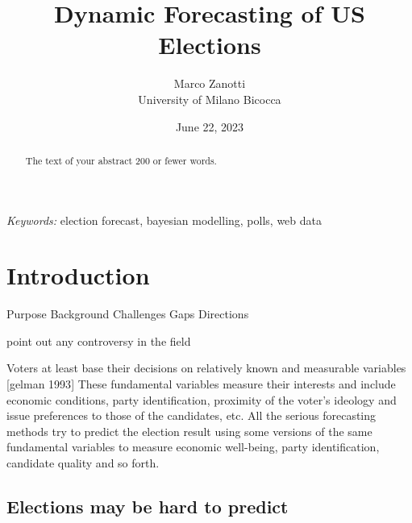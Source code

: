 \documentclass[
  12pt]{article}
\begin{document}
\def\spacingset#1{\renewcommand{\baselinestretch}%
{#1}\small\normalsize} \spacingset{1}



\date{June 22, 2023}
\title{\bf Dynamic Forecasting of US Elections}
\author{
Marco Zanotti\\
University of Milano Bicocca\\
}
\maketitle

\bigskip
\bigskip
\begin{abstract}
The text of your abstract 200 or fewer words.
\end{abstract}

\noindent%
{\it Keywords:} election forecast, bayesian modelling, polls, web data
\vfill

\newpage
\spacingset{1.9} %
\ifdefined\Shaded\renewenvironment{Shaded}{\begin{tcolorbox}[frame hidden, borderline west={3pt}{0pt}{shadecolor}, enhanced, boxrule=0pt, sharp corners, interior hidden, breakable]}{\end{tcolorbox}}\fi

\hypertarget{sec-intro}{%
\section{Introduction}\label{sec-intro}}

Purpose Background Challenges Gaps Directions

point out any controversy in the field

Voters at least base their decisions on relatively known and measurable
variables {[}gelman 1993{]} These fundamental variables measure their
interests and include economic conditions, party identification,
proximity of the voter's ideology and issue preferences to those of the
candidates, etc. All the serious forecasting methods try to predict the
election result using some versions of the same fundamental variables to
measure economic well-being, party identification, candidate quality and
so forth.

\hypertarget{elections-may-be-hard-to-predict}{%
\subsection{Elections may be hard to
predict}\label{elections-may-be-hard-to-predict}}
\end{document}
